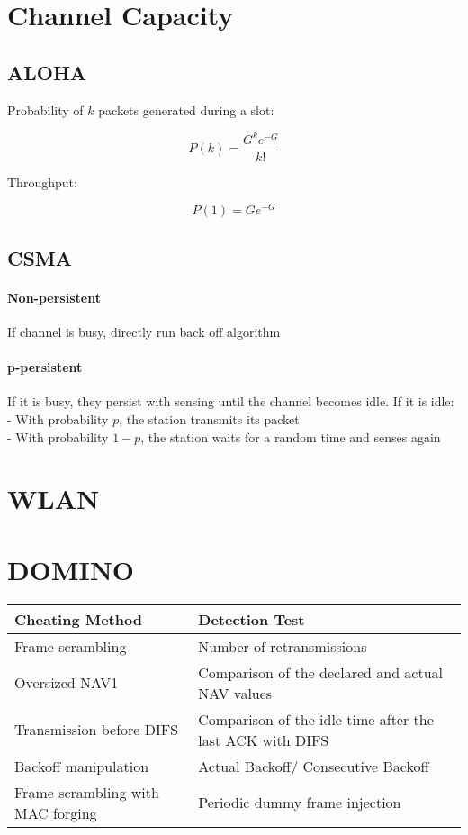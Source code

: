 \documentclass[11pt, a4paper,twocolumn]{scrartcl}
\begin{document}
\section{Channel Capacity}

\subsection{ALOHA} 
Probability of $k$ packets generated during a slot:

\begin{equation}
P(k) = \frac{G^ke^{-G}}{k!}
\end{equation}

Throughput:

\begin{equation}
P(1) = Ge^{-G}
\end{equation}

\subsection{CSMA}
\paragraph{Non-persistent} If channel is busy, directly run back off algorithm
\paragraph{p-persistent} If it is busy, they persist with sensing until the channel becomes idle. If it is idle:\\
- With probability $p$, the station transmits its packet\\
- With probability $1-p$, the station waits for a random time and senses again

\section{WLAN}

\section{DOMINO}
\begin{tabular}{|p{4cm}|p{5.2cm}|}
  \hline
  Cheating Method & Detection Test \\\hline
  Frame scrambling & Number of retransmissions \\
  Oversized NAV1 & Comparison of the declared and actual NAV values\\
  Transmission before DIFS & Comparison of the idle time after the last ACK with DIFS \\
  Backoff manipulation & Actual Backoff/ Consecutive Backoff \\
  Frame scrambling with MAC forging & Periodic dummy frame injection\\
   \hline
\end{tabular}
\end{document}
